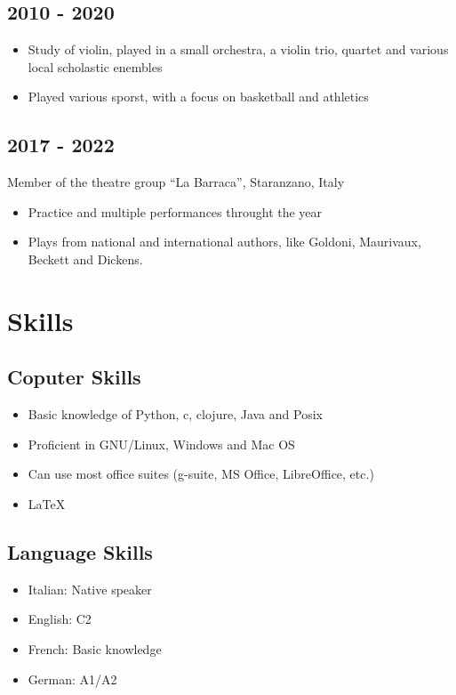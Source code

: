 \documentclass[12pt]{article}
\begin{document}
    \subsection{2010 - 2020}
	    \begin{itemize}
			\item{Study of violin, played in a small orchestra, a violin trio, quartet and  various local scholastic enembles}
			\item{Played various sporst, with a focus on basketball and athletics}
		\end{itemize}
	\subsection{2017 - 2022}
	Member of the theatre group “La Barraca”, Staranzano, Italy
 	\begin{itemize}
		\item{Practice and multiple performances throught the year}
		\item{Plays from national and international authors, like Goldoni, Maurivaux, Beckett and Dickens.}
	\end{itemize}
\section{Skills}
	\subsection{Coputer Skills}
		\begin{itemize}
			\item{Basic knowledge of Python, c, clojure, Java and Posix}
			\item{Proficient in GNU/Linux, Windows and Mac OS}
			\item{Can use most office suites (g-suite, MS Office, LibreOffice, etc.)}
			\item{\LaTeX}
		\end{itemize}
	\subsection{Language Skills}
		\begin{itemize}
			\item{Italian: Native speaker}
			\item{English: C2}
			\item{French: Basic knowledge}
			\item{German: A1/A2}
		\end{itemize}
\end{document}
